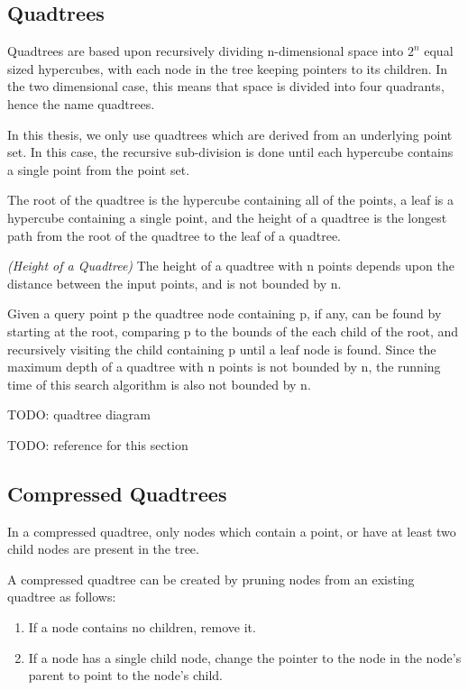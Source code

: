 \documentclass[mcs]{scsthesis}
\begin{document}
\subsection{Quadtrees}

Quadtrees are based upon recursively dividing n-dimensional space into \(2^n\)
equal sized hypercubes, with each node in the tree keeping pointers to its
children.  In the two dimensional case, this means that space is divided into
four quadrants, hence the name quadtrees.  

In this thesis, we only use quadtrees which are derived from an underlying point
set.  In this case, the recursive sub-division is done until each hypercube
contains a single point from the point set.

The root of the quadtree is the hypercube containing all of the points, a leaf
is a hypercube containing a single point, and the height of a quadtree
is the longest path from the root of the quadtree to the leaf of a quadtree.

\begin{thm} \emph{(Height of a Quadtree)}
The height of a quadtree with n points depends upon the distance between
the input points, and is not bounded by n.
\end{thm}

Given a query point p the quadtree node containing p, if any, can be found by
starting at the root, comparing p to the bounds of the each child of the root,
and recursively visiting the child containing p until a leaf node is found.  
Since the maximum depth of a quadtree with n points is not bounded by n, the
running time of this search algorithm is also not bounded by n. 

TODO: quadtree diagram

TODO: reference for this section

\subsection{Compressed Quadtrees}

In a compressed quadtree, only nodes which contain a point, or have at least
two child nodes are present in the tree.

A compressed quadtree can be created by pruning nodes from an existing quadtree
as follows:

\begin{enumerate}
\item If a node contains no children, remove it.
\item If a node has a single child node, change the pointer to the node in the
node's parent to point to the node's child.
\end{enumerate}
\end{document}
